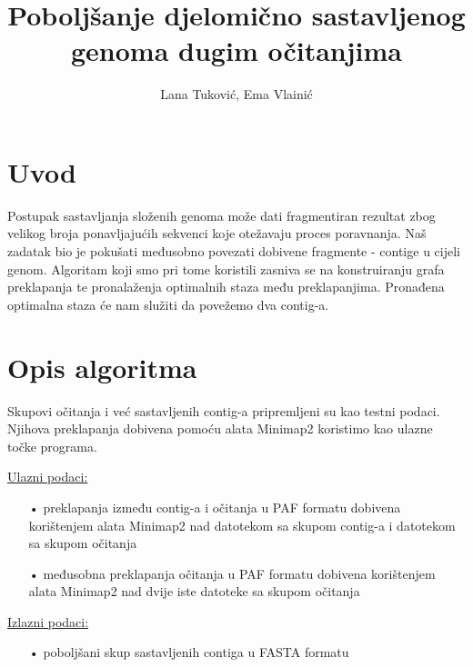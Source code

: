 \documentclass[times, utf8, seminar]{fer}
\begin{document}
\title{Poboljšanje djelomično sastavljenog genoma dugim očitanjima}

\author{Lana Tuković, Ema Vlainić}


\maketitle

\tableofcontents

\chapter{Uvod}
Postupak sastavljanja složenih genoma može dati fragmentiran rezultat zbog velikog broja ponavljajućih sekvenci koje otežavaju proces poravnanja. Naš zadatak bio je pokušati međusobno povezati dobivene fragmente - contige u cijeli genom. Algoritam koji smo pri tome koristili zasniva se na konstruiranju grafa preklapanja te pronalaženja optimalnih staza među preklapanjima. Pronađena optimalna staza će nam služiti da povežemo dva contig-a.

\chapter{Opis algoritma}
Skupovi očitanja i već sastavljenih contig-a pripremljeni su kao testni podaci. Njihova preklapanja dobivena pomoću alata Minimap2 koristimo kao ulazne točke programa.

\underline{Ulazni podaci:}
\begin{itemize}
	\item[•]{preklapanja između contig-a i očitanja u PAF formatu dobivena korištenjem alata Minimap2 \cite{minimap2} nad datotekom sa skupom contig-a i datotekom sa skupom očitanja}
	\item[•]{međusobna preklapanja očitanja u PAF formatu dobivena korištenjem alata Minimap2 nad dvije iste datoteke sa skupom očitanja}
\end{itemize}

\underline{Izlazni podaci:}
\begin{itemize}
	\item[•]{poboljšani skup sastavljenih contiga u FASTA formatu}
\end{itemize}
\end{document}
